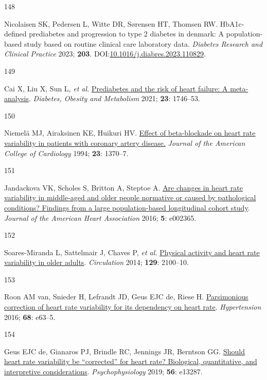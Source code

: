 \documentclass[
  a4paper,
  headsepline=true,
  open=any]{scrbook}
\newlength{\cslhangindent}
\newlength{\csllabelwidth}
\newlength{\cslentryspacingunit} %
\newenvironment{CSLReferences}[2] %
 {%
  \setlength{\parindent}{0pt}
  \ifodd #1
  \let\oldpar\par
  \def\par{\hangindent=\cslhangindent\oldpar}
  \fi
  \setlength{\parskip}{#2\cslentryspacingunit}
 }%
 {}
\newcommand{\CSLLeftMargin}[1]{\parbox[t]{\csllabelwidth}{#1}}
\newcommand{\CSLRightInline}[1]{\parbox[t]{\linewidth - \csllabelwidth}{#1}\break}
\begin{document}
\begin{CSLReferences}{0}{0}
\leavevmode{}%
\CSLLeftMargin{148 }%
\CSLRightInline{Nicolaisen SK, Pedersen L, Witte DR, Sørensen HT,
Thomsen RW. HbA1c-defined prediabetes and progression to type 2 diabetes
in denmark: A population-based study based on routine clinical care
laboratory data. \emph{Diabetes Research and Clinical Practice} 2023;
\textbf{203}.
DOI:\href{https://doi.org/10.1016/j.diabres.2023.110829}{10.1016/j.diabres.2023.110829}.}

\leavevmode{}%
\CSLLeftMargin{149 }%
\CSLRightInline{Cai X, Liu X, Sun L, \emph{et al.}
\href{https://doi.org/10.1111/dom.14388}{Prediabetes and the risk of
heart failure: A meta-analysis}. \emph{Diabetes, Obesity and Metabolism}
2021; \textbf{23}: 1746--53.}

\leavevmode{}%
\CSLLeftMargin{150 }%
\CSLRightInline{Niemelä MJ, Airaksinen KE, Huikuri HV.
\href{https://doi.org/10.1016/0735-1097(94)90379-4}{Effect of
beta-blockade on heart rate variability in patients with coronary artery
disease.} \emph{Journal of the American College of Cardiology} 1994;
\textbf{23}: 1370--7.}

\leavevmode{}%
\CSLLeftMargin{151 }%
\CSLRightInline{Jandackova VK, Scholes S, Britton A, Steptoe A.
\href{https://doi.org/doi:10.1161/JAHA.115.002365}{Are changes in heart
rate variability in middle{-}aged and older people normative or caused
by pathological conditions? Findings from a large population{-}based
longitudinal cohort study}. \emph{Journal of the American Heart
Association} 2016; \textbf{5}: e002365.}

\leavevmode{}%
\CSLLeftMargin{152 }%
\CSLRightInline{Soares-Miranda L, Sattelmair J, Chaves P, \emph{et al.}
\href{https://doi.org/10.1161/CIRCULATIONAHA.113.005361}{Physical
activity and heart rate variability in older adults}. \emph{Circulation}
2014; \textbf{129}: 2100--10.}

\leavevmode{}%
\CSLLeftMargin{153 }%
\CSLRightInline{Roon AM van, Snieder H, Lefrandt JD, Geus EJC de, Riese
H. \href{https://doi.org/10.1161/HYPERTENSIONAHA.116.08053}{Parsimonious
correction of heart rate variability for its dependency on heart rate}.
\emph{Hypertension} 2016; \textbf{68}: e63--5.}

\leavevmode{}%
\CSLLeftMargin{154 }%
\CSLRightInline{Geus EJC de, Gianaros PJ, Brindle RC, Jennings JR,
Berntson GG. \href{https://doi.org/10.1111/psyp.13287}{Should heart rate
variability be {``}corrected{''} for heart rate? Biological,
quantitative, and interpretive considerations}. \emph{Psychophysiology}
2019; \textbf{56}: e13287.}


\end{CSLReferences}
\end{document}
